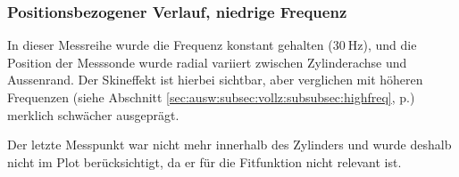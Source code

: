 {    %
    \subsubsection{Positionsbezogener Verlauf, niedrige Frequenz}
    \label{sec:ausw:subsec:hohlz:subsubsec:steel}

	\begin{minipage}[t]{0.33\textwidth}
        \vspace{0mm}
        In   dieser   Messreihe   wurde   die   Frequenz   konstant   gehalten
        ($\SI{30}{\hertz}$),  und  die  Position der  Messsonde  wurde  radial
        variiert  zwischen  Zylinderachse   und  Aussenrand.   Der  Skineffekt
        ist  hierbei  sichtbar,  aber   verglichen  mit  h\"oheren  Frequenzen
        (siehe    Abschnitt    \ref{sec:ausw:subsec:vollz:subsubsec:highfreq},
        p.\pageref{sec:ausw:subsec:vollz:subsubsec:highfreq})         merklich
        schw\"acher ausgepr\"agt.

        Der letzte Messpunkt war nicht  mehr innerhalb des Zylinders und wurde
        deshalb nicht  im Plot ber\"ucksichtigt,  da er f\"ur  die Fitfunktion
        nicht relevant ist.


\end{minipage}}
